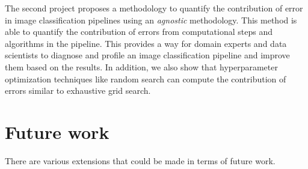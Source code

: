The second project proposes a methodology to quantify the contribution of error in image classification pipelines using an \textit{agnostic} methodology. This method is able to quantify the contribution of errors from computational steps and algorithms in the pipeline. This provides a way for domain experts and data scientists to diagnose and profile an image classification pipeline and improve them based on the results. In addition, we also show that hyperparameter optimization techniques like random search can compute the contribution of errors similar to exhaustive grid search.

\section{Future work}
There are various extensions that could be made in terms of future work.
